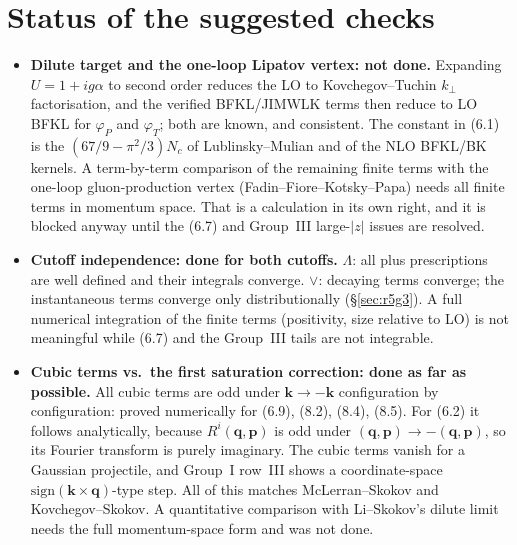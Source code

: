 \documentclass[10pt]{article}
\begin{document}
\section{Status of the suggested checks}\label{sec:next}
\begin{itemize}
\item \textbf{Dilute target and the one-loop Lipatov vertex: not done.} Expanding $U=1+ig\alpha$ to second order reduces the LO to Kovchegov--Tuchin $k_\perp$ factorisation, and the
verified BFKL/JIMWLK terms then reduce to LO BFKL for $\varphi_P$ and $\varphi_T$; both are known, and consistent. The constant in (6.1) is the
$(67/9-\pi^2/3)N_c$ of Lublinsky--Mulian and of the NLO BFKL/BK kernels. A term-by-term comparison of the remaining finite terms with the one-loop
gluon-production vertex (Fadin--Fiore--Kotsky--Papa) needs all finite terms in momentum space. That is a calculation in its own right, and it is
blocked anyway until the (6.7) and Group~III large-$|z|$ issues are resolved.
\item \textbf{Cutoff independence: done for both cutoffs.} $\Lambda$: all plus prescriptions are well defined and their integrals converge. $\vee$: decaying terms converge;
the instantaneous terms converge only distributionally (\S\ref{sec:r5g3}). A full numerical integration of the finite terms (positivity, size relative to LO) is
not meaningful while (6.7) and the Group~III tails are not integrable.
\item \textbf{Cubic terms vs.\ the first saturation correction: done as far as possible.} All cubic terms are odd under $\mathbf k\to-\mathbf k$ configuration by configuration: proved numerically for
(6.9), (8.2), (8.4), (8.5). For (6.2) it follows analytically, because $R^i(\mathbf q,\mathbf p)$ is odd under $(\mathbf q,\mathbf p)\to-(\mathbf q,\mathbf p)$, so its Fourier transform is purely imaginary. The
cubic terms vanish for a Gaussian projectile, and Group~I row~III shows a coordinate-space $\mathrm{sign}(\mathbf k\times\mathbf q)$-type step. All of this matches
McLerran--Skokov and Kovchegov--Skokov. A quantitative comparison with Li--Skokov's dilute limit needs the full momentum-space form and was not done.
\end{itemize}

\appendix
\end{document}
